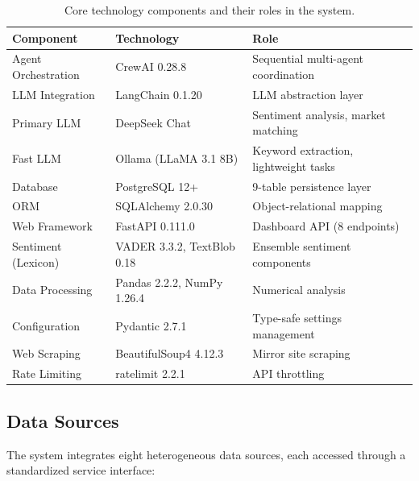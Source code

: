 \documentclass[12pt, letterpaper]{article}
\begin{document}
\begin{table}[H]
\centering
\caption{Core technology components and their roles in the system.}
\label{tab:tech_stack}
\begin{tabular}{@{}lll@{}}
\toprule
\textbf{Component} & \textbf{Technology} & \textbf{Role} \\
\midrule
Agent Orchestration & CrewAI 0.28.8 & Sequential multi-agent coordination \\
LLM Integration & LangChain 0.1.20 & LLM abstraction layer \\
Primary LLM & DeepSeek Chat & Sentiment analysis, market matching \\
Fast LLM & Ollama (LLaMA 3.1 8B) & Keyword extraction, lightweight tasks \\
Database & PostgreSQL 12+ & 9-table persistence layer \\
ORM & SQLAlchemy 2.0.30 & Object-relational mapping \\
Web Framework & FastAPI 0.111.0 & Dashboard API (8 endpoints) \\
Sentiment (Lexicon) & VADER 3.3.2, TextBlob 0.18 & Ensemble sentiment components \\
Data Processing & Pandas 2.2.2, NumPy 1.26.4 & Numerical analysis \\
Configuration & Pydantic 2.7.1 & Type-safe settings management \\
Web Scraping & BeautifulSoup4 4.12.3 & Mirror site scraping \\
Rate Limiting & ratelimit 2.2.1 & API throttling \\
\bottomrule
\end{tabular}
\end{table}

\subsection{Data Sources}

The system integrates eight heterogeneous data sources, each accessed through a standardized service interface:
\end{document}
